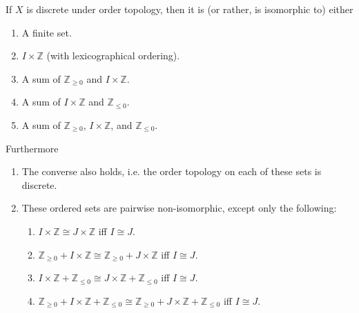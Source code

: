 \documentclass{treatise}
\begin{document}
\begin{theorem}
If $X$ is discrete under order topology, then it is (or rather, is isomorphic to) either
\begin{enumerate}
    \item A finite set.
    \item $I \times \mathbb{Z}$ (with lexicographical ordering).
    \item A sum of $\mathbb{Z}_{\geq 0}$ and $I \times \mathbb{Z}$.
    \item A sum of $I \times \mathbb{Z}$ and $\mathbb{Z}_{\leq 0}$.
    \item A sum of $\mathbb{Z}_{\geq 0}$, $I \times \mathbb{Z}$, and $\mathbb{Z}_{\leq 0}$.
\end{enumerate}
Furthermore
\begin{enumerate}
    \item The converse also holds, i.e. the order topology on each of these sets is discrete.
    \item These ordered sets are pairwise non-isomorphic, except only the following:
    \begin{enumerate}
        \item $I \times \mathbb{Z} \cong J \times \mathbb{Z}$ iff $I \cong J$.
        \item $\mathbb{Z}_{\geq 0} + I \times \mathbb{Z} \cong \mathbb{Z}_{\geq 0} + J \times \mathbb{Z}$ iff $I \cong J$.
        \item $I \times \mathbb{Z} + \mathbb{Z}_{\leq 0} \cong J \times \mathbb{Z} + \mathbb{Z}_{\leq 0}$ iff $I \cong J$.
        \item $\mathbb{Z}_{\geq 0} + I \times \mathbb{Z} + \mathbb{Z}_{\leq 0} \cong \mathbb{Z}_{\geq 0} + J \times \mathbb{Z} + \mathbb{Z}_{\leq 0}$ iff $I \cong J$.
    \end{enumerate}
\end{enumerate}
\end{theorem}
\end{document}
